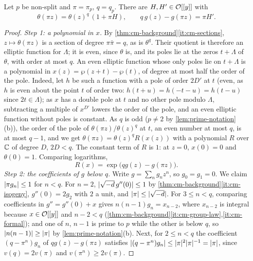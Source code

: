 \begin{theorem}\label{thm:frobenius-congruence}
Let $p$ be non-split and $\pi=\pi_p$, $q=q_p$. There are $H,H'\in\mathcal{O}[[y]]$ with
\[
  \theta(\pi z)=\theta(z)^q\,(1+\pi H),\qquad q\,g(z)-g(\pi z)=\pi H' .
\]
\end{theorem}

\begin{proof}
\emph{Step 1: a polynomial in $x$.} By \cref{thm:cm-background}\ref{it:cm-sections},
$z\mapsto\theta(\pi z)$ is a section of degree $\pi\bar\pi=q$, as is $\theta^q$. Their quotient is
therefore an elliptic function for $\Lambda$; it is even, since $\theta$ is, and its poles lie at the
zeros $t+\Lambda$ of $\theta$, with order at most $q$. An even elliptic function whose only poles lie
on $t+\Lambda$ is a polynomial in $x(z)=\wp(z+t)-\wp(t)$, of degree at most half the order of the
pole. Indeed, let $h$ be such a function with a pole of order $2D'$ at $t$ (even, as $h$ is even about the point $t$ of order two: $h(t+u)=h(-t-u)=h(t-u)$ since $2t\in\Lambda$); as $x$ has a double pole at $t$ and no other pole modulo $\Lambda$, subtracting a multiple of $x^{D'}$ lowers the order of the pole, and an even elliptic function without poles is constant. As $q$ is odd ($p\ne2$ by \cref{lem:prime-notation}(b)), the order of the pole of $\theta(\pi z)/\theta(z)^q$ at $t$, an even number at most $q$, is at most $q-1$, and we get $\theta(\pi z)=\theta(z)^qR(x(z))$
with a polynomial $R$ over $\mathbb{C}$ of degree $D$, $2D<q$. The constant term of $R$ is $1$: at $z=0$, $x(0)=0$ and $\theta(0)=1$. Comparing logarithms,
\[
  R(x)=\exp\bigl(qg(z)-g(\pi z)\bigr).
\]
\emph{Step 2: the coefficients of $g$ below $q$.} Write $g=\sum_ng_nz^n$, so $g_0=g_1=0$. We claim
$\lvert \pi g_n\rvert\le1$ for $n<q$. For $n=2$, $\lvert \sqrt{-d}\,g''(0)\rvert\le1$ by
\cref{thm:cm-background}\ref{it:cm-isogeny}, $g''(0)=2g_2$ with $2$ a unit, and $\lvert \pi\rvert\le
\lvert \sqrt{-d}\rvert$. For $3\le n<q$, comparing coefficients in $g''=g''(0)+x$ gives
$n(n-1)g_n=x_{n-2}$, where $x_{n-2}$ is integral because $x\in\mathcal{O}[[y]]$ and $n-2<q$
(\cref{thm:cm-background}\ref{it:cm-group-law},\ref{it:cm-formal}); and one of $n$, $n-1$ is prime
to $p$ while the other is below $q$, so $\lvert n(n-1)\rvert\ge\lvert \pi\rvert$ by \cref{lem:prime-notation}(b).
Next, for $2\le n<q$ the coefficient $(q-\pi^n)g_n$ of $qg(z)-g(\pi z)$ satisfies
$\lvert (q-\pi^n)g_n\rvert\le\lvert \pi\rvert^2\lvert \pi\rvert^{-1}=\lvert \pi\rvert$, since $v(q)=2v(\pi)$ and $v(\pi^n)\ge2v(\pi)$.


\end{proof}
